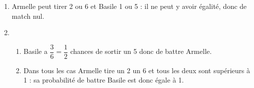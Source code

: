 
\medskip

%
%
%
%
%
%

\begin{enumerate}
\item %
Armelle peut tirer 2 ou 6 et Basile 1 ou 5 : il ne peut y avoir égalité, donc de match nul.
\item 
	\begin{enumerate}
		\item %
Basile a $\dfrac{3}{6} = \dfrac{1}{2}$ chances de sortir un 5 donc de battre Armelle.
		\item %
Dans tous les cas Armelle  tire un 2  un 6 et tous les deux sont supérieurs à 1 : sa probabilité de battre  Basile est donc égale à 1.
 	\end{enumerate}
\end{enumerate}
 
